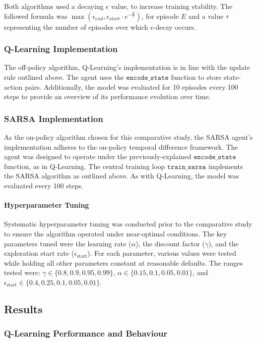 \documentclass{article}
\begin{document}
Both algorithms used a decaying $\epsilon$ value, to increase training stability. The followed formula was $\max(\epsilon_{end}, \epsilon_{start} \cdot e^{-\frac{E}{\tau}})$, for episode $E$ and a value $\tau$ representing the number of episodes over which $\epsilon$-decay occurs. 

\subsubsection{Q-Learning Implementation}
The off-policy algorithm, Q-Learning's implementation is in line with the update rule outlined above. The agent uses the $\texttt{encode\_state}$ function to store state-action pairs. Additionally, the model was evaluated for 10 episodes every 100 steps to provide an overview of its performance evolution over time.

\subsubsection{SARSA Implementation}
As the on-policy algorithm chosen for this comparative study, the SARSA agent's implementation adheres to the on-policy temporal difference framework. The agent was designed to operate under the previously-explained $\texttt{encode\_state}$ function, as in Q-Learning. The central training loop $\texttt{train\_sarsa}$ implements the SARSA algorithm as outlined above. As with Q-Learning, the model was evaluated every 100 steps. 

\paragraph{Hyperparameter Tuning}
Systematic hyperparameter tuning was conducted prior to the comparative study to ensure the algorithm operated under near-optimal conditions. The key parameters tuned were the learning rate ($\alpha$), the discount factor ($\gamma$), and the exploration start rate ($\epsilon_{\text{start}}$).
For each parameter, various values were tested while holding all other parameters constant at reasonable defaults. The ranges tested were: $\gamma \in \{0.8, 0.9, 0.95, 0.99\}$, $\alpha \in \{0.15, 0.1, 0.05, 0.01\}$, and $\epsilon_{\text{start}} \in \{0.4, 0.25, 0.1, 0.05, 0.01\}$.

\subsection{Results}

\subsubsection{Q-Learning Performance and Behaviour}
\end{document}
